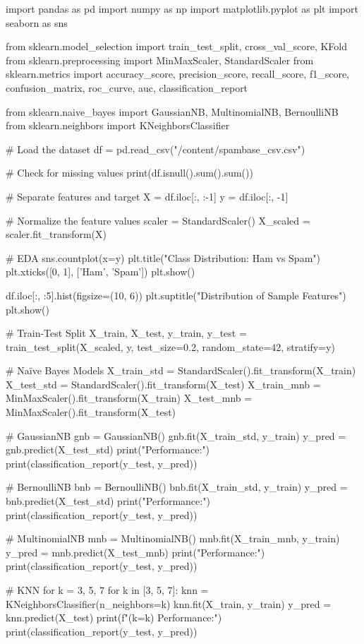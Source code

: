 import pandas as pd
import numpy as np
import matplotlib.pyplot as plt
import seaborn as sns

from sklearn.model_selection import train_test_split, cross_val_score, KFold
from sklearn.preprocessing import MinMaxScaler, StandardScaler
from sklearn.metrics import accuracy_score, precision_score, recall_score, f1_score, confusion_matrix, roc_curve, auc, classification_report

from sklearn.naive_bayes import GaussianNB, MultinomialNB, BernoulliNB
from sklearn.neighbors import KNeighborsClassifier

# Load the dataset
df = pd.read_csv("/content/spambase_csv.csv")

# Check for missing values
print(df.isnull().sum().sum())

# Separate features and target
X = df.iloc[:, :-1]
y = df.iloc[:, -1]

# Normalize the feature values
scaler = StandardScaler()
X_scaled = scaler.fit_transform(X)

# EDA
sns.countplot(x=y)
plt.title("Class Distribution: Ham vs Spam")
plt.xticks([0, 1], ['Ham', 'Spam'])
plt.show()

df.iloc[:, :5].hist(figsize=(10, 6))
plt.suptitle("Distribution of Sample Features")
plt.show()

# Train-Test Split
X_train, X_test, y_train, y_test = train_test_split(X_scaled, y, test_size=0.2, random_state=42, stratify=y)

# Naïve Bayes Models
X_train_std = StandardScaler().fit_transform(X_train)
X_test_std = StandardScaler().fit_transform(X_test)
X_train_mnb = MinMaxScaler().fit_transform(X_train)
X_test_mnb = MinMaxScaler().fit_transform(X_test)

# GaussianNB
gnb = GaussianNB()
gnb.fit(X_train_std, y_train)
y_pred = gnb.predict(X_test_std)
print("\nGaussianNB Performance:")
print(classification_report(y_test, y_pred))

# BernoulliNB
bnb = BernoulliNB()
bnb.fit(X_train_std, y_train)
y_pred = bnb.predict(X_test_std)
print("\nBernoulliNB Performance:")
print(classification_report(y_test, y_pred))

# MultinomialNB
mnb = MultinomialNB()
mnb.fit(X_train_mnb, y_train)
y_pred = mnb.predict(X_test_mnb)
print("\nMultinomialNB Performance:")
print(classification_report(y_test, y_pred))

# KNN for k = 3, 5, 7
for k in [3, 5, 7]:
    knn = KNeighborsClassifier(n_neighbors=k)
    knn.fit(X_train, y_train)
    y_pred = knn.predict(X_test)
    print(f"\nKNN (k={k}) Performance:")
    print(classification_report(y_test, y_pred))

